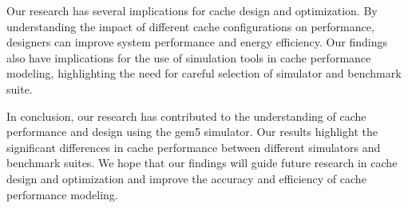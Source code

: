 \documentclass[conference]{IEEEtran}
\begin{document}
Our research has several implications for cache design and optimization. By understanding the impact of different cache configurations on performance, designers can improve system performance and energy efficiency. Our findings also have implications for the use of simulation tools in cache performance modeling, highlighting the need for careful selection of simulator and benchmark suite.

In conclusion, our research has contributed to the understanding of cache performance and design using the gem5 simulator. Our results highlight the significant differences in cache performance between different simulators and benchmark suites. We hope that our findings will guide future research in cache design and optimization and improve the accuracy and efficiency of cache performance modeling.

\printbibliography
\onecolumn

\appendix
\setcounter{section}{0}
\end{document}
